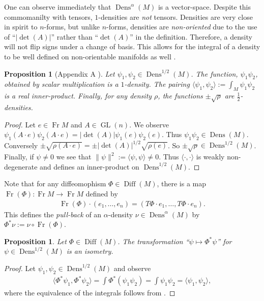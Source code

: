 \documentclass[letterpaper, 10 pt, conference]{ieeeconf}
\newtheorem{prop}[thm]{Proposition}
\DeclareMathOperator{\Diff}{Diff}
\DeclareMathOperator{\Fr}{Fr}
\DeclareMathOperator{\GL}{GL}
\DeclareMathOperator{\Dens}{Dens}
\begin{document}
  One can observe immediately that $\Dens^\alpha(M)$ is a vector-space.
  Despite this commomanilty with tensors,
  $1$-densities are \emph{not} tensors.
  Densities are very close in spirit to $n$-forms,
  but unlike $n$-forms, densities are \emph{non-oriented}
  due to the use of ``$|\det(A)|$'' rather than ``$\det(A)$'' 
  in the definition.
  Therefore, a density will not flip signs under a change of basis.
  This allows for the integral of a density to be well defined
  on non-orientable manifolds as well \cite[Ch. 14]{Lee2006}.

  \begin{prop}[Appendix A \cite{BatesWeinstein1997}]
    Let $\psi_1,\psi_2 \in \Dens^{1/2}(M)$.
    The function, $\psi_1 \psi_2$, obtained by
    scalar multiplication is a $1$-density.
    The pairing
    $
    \langle \psi_1, \psi_2 \rangle := \int_M \psi_1 \psi_2 
    $
    is a real inner-product.
    Finally, for any density $\rho$, the functions $\pm\sqrt{\rho}$ are
    $\frac{1}{2}$-densities.
  \end{prop}
  \begin{proof}
    Let $e \in \Fr M$ and $A \in \GL(n)$.
    We observe $\psi_1(A \cdot e) \psi_2(A \cdot e) = |\det(A) | \psi_1(e) \psi_2(e)$.  Thus $\psi_1 \psi_2 \in \Dens(M)$.
    Conversely $\pm \sqrt{\rho( A \cdot e)} = \pm | \det(A) |^{1/2} \sqrt{ \rho(e)}$. So $\pm \sqrt{\rho} \in \Dens^{1/2}(M)$.
    Finally, if $\psi \neq 0$ we see that $\| \psi \|^2 := \langle \psi , \psi \rangle \neq 0$.
    Thus $\langle \cdot , \cdot \rangle$ is weakly non-degenerate
    and defines an inner-product on $\Dens^{1/2}(M)$.
  \end{proof}

  Note that for any diffeomophism $\Phi \in \Diff(M)$,
  there is a map $\Fr(\Phi) : \Fr M \to \Fr M$ defined by
  \begin{align*}
    \Fr(\Phi) \cdot (e_1,\dots,e_n) = 
    (T\Phi \cdot e_1,\dots,T\Phi \cdot e_n).
  \end{align*}
  This defines the \emph{pull-back} of an $\alpha$-density
  $\nu \in \Dens^\alpha(M)$ by $\Phi^* \nu := \nu \circ \Fr(\Phi)$.
  \begin{prop} \label{prop:isom}
    Let $\Phi \in \Diff(M)$.
    The transformation ``$\psi \mapsto \Phi^* \psi$'' for
    $\psi \in \Dens^{1/2}(M)$ is an isometry.
  \end{prop}
  \begin{proof}
    Let $\psi_1,\psi_2 \in \Dens^{1/2}(M)$ and observe
    \begin{align*}
      \langle \Phi^* \psi_1, \Phi^* \psi_2 \rangle
      = \int \Phi^*( \psi_1 \psi_2)
      = \int \psi_1 \psi_2
      = \langle \psi_1, \psi_2 \rangle,
    \end{align*}
    where the equivalence of the integrals follows
    from \cite[Proposition 14.32(c)]{Lee2006}.
  \end{proof}
  
\end{document}
